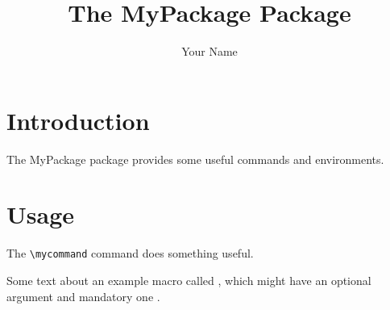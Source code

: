 \documentclass{l3doc}
\begin{document}
\title{The MyPackage Package}
\author{Your Name}
\maketitle

\section{Introduction}

   The MyPackage package provides some useful commands and environments.

\section{Usage}

   The \verb|\mycommand| command does something useful.

\DescribeMacro{\mytl}
Some text about an example macro called , which
might have an optional argument  and mandatory one
.
\end{document}
